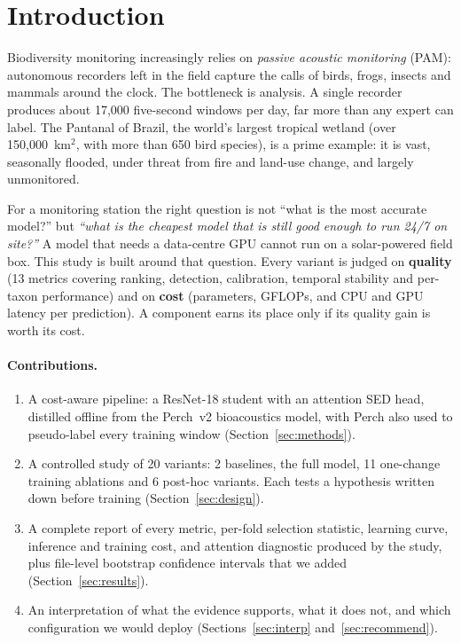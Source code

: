 \documentclass[11pt]{article}
\begin{document}
\tableofcontents
\newpage

\section{Introduction}

Biodiversity monitoring increasingly relies on \emph{passive acoustic
monitoring} (PAM): autonomous recorders left in the field capture the calls of
birds, frogs, insects and mammals around the clock. The bottleneck is
analysis. A single recorder produces about 17{,}000 five-second windows per
day, far more than any expert can label. The Pantanal of Brazil, the world's
largest tropical wetland (over 150{,}000~km$^2$, with more than 650 bird
species), is a prime example: it is vast, seasonally flooded, under threat
from fire and land-use change, and largely unmonitored.

For a monitoring station the right question is not ``what is the most
accurate model?'' but \emph{``what is the cheapest model that is still good
enough to run 24/7 on site?''} A model that needs a data-centre GPU cannot run
on a solar-powered field box. This study is built around that question. Every
variant is judged on \textbf{quality} (13 metrics covering ranking, detection,
calibration, temporal stability and per-taxon performance) and on
\textbf{cost} (parameters, GFLOPs, and CPU and GPU latency per prediction). A
component earns its place only if its quality gain is worth its cost.

\paragraph{Contributions.}
\begin{enumerate}
  \item A cost-aware pipeline: a ResNet-18 student with an attention SED head,
        distilled offline from the Perch~v2 bioacoustics model, with Perch
        also used to pseudo-label every training window
        (Section~\ref{sec:methods}).
  \item A controlled study of 20 variants: 2 baselines, the full model, 11
        one-change training ablations and 6 post-hoc variants. Each tests a
        hypothesis written down before training (Section~\ref{sec:design}).
  \item A complete report of every metric, per-fold selection statistic,
        learning curve, inference and training cost, and attention
        diagnostic produced by the study, plus file-level bootstrap
        confidence intervals that we added (Section~\ref{sec:results}).
  \item An interpretation of what the evidence supports, what it does not,
        and which configuration we would deploy (Sections~\ref{sec:interp}
        and~\ref{sec:recommend}).
\end{enumerate}
\end{document}
